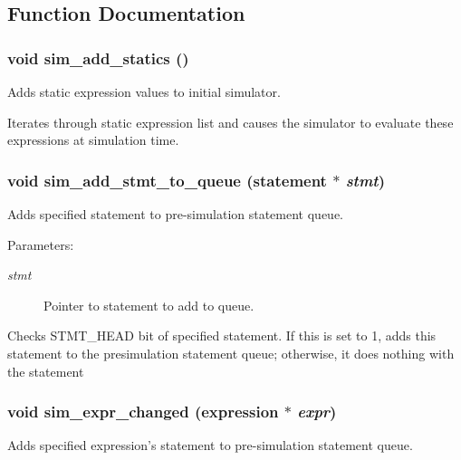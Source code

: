 \subsection{Function Documentation}
\subsubsection{\setlength{\rightskip}{0pt plus 5cm}void sim\_\-add\_\-statics ()}\label{sim_8c_a7}


Adds static expression values to initial simulator.

Iterates through static expression list and causes the simulator to evaluate these expressions at simulation time. 
\subsubsection{\setlength{\rightskip}{0pt plus 5cm}void sim\_\-add\_\-stmt\_\-to\_\-queue ({\bf statement} $\ast$ {\em stmt})}\label{sim_8c_a6}


Adds specified statement to pre-simulation statement queue.

\begin{Desc}
\item[Parameters:]
\begin{description}
\item[{\em stmt}]Pointer to statement to add to queue.\end{description}
\end{Desc}
Checks STMT\_\-HEAD bit of specified statement. If this is set to 1, adds this statement to the presimulation statement queue; otherwise, it does nothing with the statement 
\subsubsection{\setlength{\rightskip}{0pt plus 5cm}void sim\_\-expr\_\-changed ({\bf expression} $\ast$ {\em expr})}\label{sim_8c_a5}


Adds specified expression's statement to pre-simulation statement queue.

